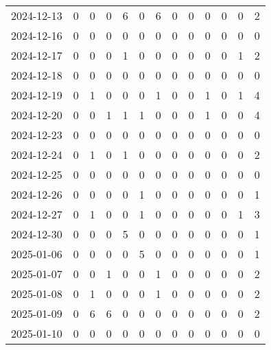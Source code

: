 \documentclass[dvipdfmx,oneside]{article}
\begin{document}
\begin{longtable}{lcccccccccccc}
        2024-12-13 &     0 &     0 &     0 &     6 &     0 &     6 &     0 &     0 &     0 &     0 &     0 &      2 \\
        2024-12-16 &     0 &     0 &     0 &     0 &     0 &     0 &     0 &     0 &     0 &     0 &     0 &      0 \\
        2024-12-17 &     0 &     0 &     0 &     1 &     0 &     0 &     0 &     0 &     0 &     0 &     1 &      2 \\
        2024-12-18 &     0 &     0 &     0 &     0 &     0 &     0 &     0 &     0 &     0 &     0 &     0 &      0 \\
        2024-12-19 &     0 &     1 &     0 &     0 &     0 &     1 &     0 &     0 &     1 &     0 &     1 &      4 \\
        2024-12-20 &     0 &     0 &     1 &     1 &     1 &     0 &     0 &     0 &     1 &     0 &     0 &      4 \\
        2024-12-23 &     0 &     0 &     0 &     0 &     0 &     0 &     0 &     0 &     0 &     0 &     0 &      0 \\
        2024-12-24 &     0 &     1 &     0 &     1 &     0 &     0 &     0 &     0 &     0 &     0 &     0 &      2 \\
        2024-12-25 &     0 &     0 &     0 &     0 &     0 &     0 &     0 &     0 &     0 &     0 &     0 &      0 \\
        2024-12-26 &     0 &     0 &     0 &     0 &     1 &     0 &     0 &     0 &     0 &     0 &     0 &      1 \\
        2024-12-27 &     0 &     1 &     0 &     0 &     1 &     0 &     0 &     0 &     0 &     0 &     1 &      3 \\
        2024-12-30 &     0 &     0 &     0 &     5 &     0 &     0 &     0 &     0 &     0 &     0 &     0 &      1 \\
        2025-01-06 &     0 &     0 &     0 &     0 &     5 &     0 &     0 &     0 &     0 &     0 &     0 &      1 \\
        2025-01-07 &     0 &     0 &     1 &     0 &     0 &     1 &     0 &     0 &     0 &     0 &     0 &      2 \\
        2025-01-08 &     0 &     1 &     0 &     0 &     0 &     1 &     0 &     0 &     0 &     0 &     0 &      2 \\
        2025-01-09 &     0 &     6 &     6 &     0 &     0 &     0 &     0 &     0 &     0 &     0 &     0 &      2 \\
        2025-01-10 &     0 &     0 &     0 &     0 &     0 &     0 &     0 &     0 &     0 &     0 &     0 &      0 \\

\end{longtable}
\end{document}
